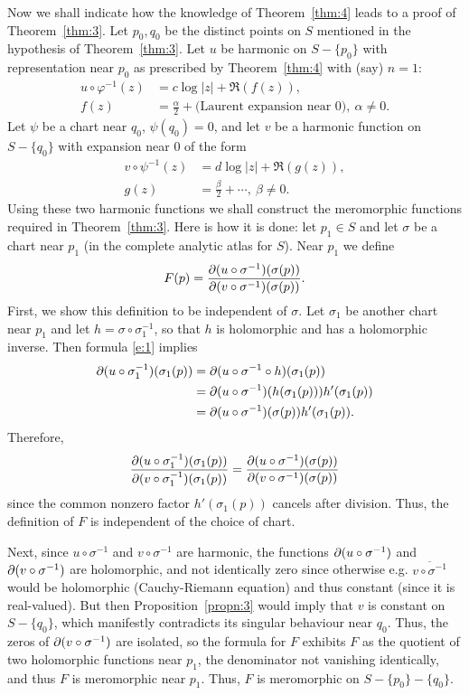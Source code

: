 \documentclass[a4paper,11pt]{article}
\begin{document}
Now we shall indicate how the knowledge of Theorem~\ref{thm:4} leads
to a proof of Theorem~\ref{thm:3}.  Let $p_0, q_0$ be the distinct
points on $S$ mentioned in the hypothesis of Theorem~\ref{thm:3}.  Let
$u$ be harmonic on $S - \{p_0\}$ with representation near $p_0$ as
prescribed by Theorem~\ref{thm:4} with (say) $n=1$:
$$
\begin{aligned}
  u \circ \varphi^{-1}(z) &= c\log|z| + \Re(f(z)),\\
  f(z) &= \frac{\alpha}{2} + \text{(Laurent expansion near 0)},\
  \alpha \ne 0.
\end{aligned}
$$
Let $\psi$ be a chart near $q_0$, $\psi(q_0) = 0$, and let $v$ be a
harmonic function on $S - \{q_0\}$ with expansion near 0 of the form
$$
\begin{aligned}
  v \circ \psi^{-1}(z) &= d\log|z| + \Re(g(z)),\\
  g(z) &= \frac{\beta}{2} + \cdots,\ \beta \ne 0.
\end{aligned}
$$
Using these two harmonic functions we shall construct the meromorphic
functions required in Theorem~\ref{thm:3}.  Here is how it is done:
let $p_1 \in S$ and let $\sigma$ be a chart near $p_1$ (in the
complete analytic atlas for $S$).  Near $p_1$ we define
$$
F(p) = \frac{\partial(u\circ \sigma^{-1})(\sigma(p))}{
  \partial(v\circ \sigma^{-1})(\sigma(p))}.
$$
First, we show this definition to be independent of $\sigma$.  Let
$\sigma_1$ be another chart near $p_1$ and let $h = \sigma \circ
\sigma_1^{-1}$, so that $h$ is holomorphic and has a holomorphic
inverse.  Then formula \eqref{e:1} implies
$$
\begin{aligned}
  \partial(u\circ \sigma_1^{-1})(\sigma_1(p))
  &= \partial(u\circ \sigma^{-1} \circ h)(\sigma_1(p))\\
  &= \partial(u\circ \sigma^{-1})(h(\sigma_1(p)))h'(\sigma_1(p))\\
  &= \partial(u\circ \sigma^{-1})(\sigma(p))h'(\sigma_1(p)).
\end{aligned}
$$
Therefore,
$$
\frac{\partial(u\circ\sigma_1^{-1})(\sigma_1(p))}{
  \partial(v\circ\sigma_1^{-1})(\sigma_1(p))}
= \frac{\partial(u\circ\sigma^{-1})(\sigma(p))}{
  \partial(v\circ\sigma^{-1})(\sigma(p))}
$$
since the common nonzero factor $h'(\sigma_1(p))$ cancels after
division.  Thus, the definition of $F$ is independent of the choice of
chart.

Next, since $u \circ \sigma^{-1}$ and $v \circ \sigma^{-1}$ are
harmonic, the functions $\partial(u \circ \sigma^{-1})$ and $\partial(v\circ
\sigma^{-1})$ are holomorphic, and not identically zero since
otherwise e.g. $\overline{v \circ \sigma^{-1}}$ would be holomorphic
(Cauchy-Riemann equation) and thus constant (since it is
real-valued).  But then Proposition~\ref{propn:3} would imply that $v$
is constant on $S - \{q_0\}$, which manifestly contradicts its
singular behaviour near $q_0$.  Thus, the zeros of $\partial(v\circ
\sigma^{-1})$ are isolated, so the formula for $F$ exhibits $F$ as the
quotient of two holomorphic functions near $p_1$, the denominator not
vanishing identically, and thus $F$ is meromorphic near $p_1$.  Thus,
$F$ is meromorphic on $S - \{p_0\} - \{q_0\}$.
\end{document}
